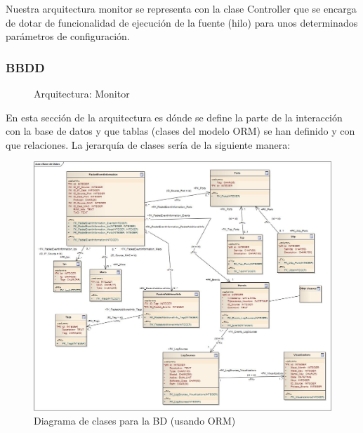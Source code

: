 Nuestra arquitectura monitor se representa con la clase Controller que se encarga de dotar de funcionalidad de ejecución de la fuente (hilo) para unos determinados parámetros de configuración.

\subsubsection{BBDD}

\begin{figure}[H]
  \caption{Arquitectura: Monitor}
\end{figure}

En esta sección de la arquitectura es dónde se define la parte de la interacción con la base de datos y que tablas (clases del modelo ORM) se han definido y con que relaciones. La jerarquía de clases sería de la siguiente manera: \\
\newpage
\begin{figure}[H]
\includegraphics[scale=.35]{diagramas/bd.jpg}
\caption{Diagrama de clases para la BD (usando ORM)}
\end{figure}

